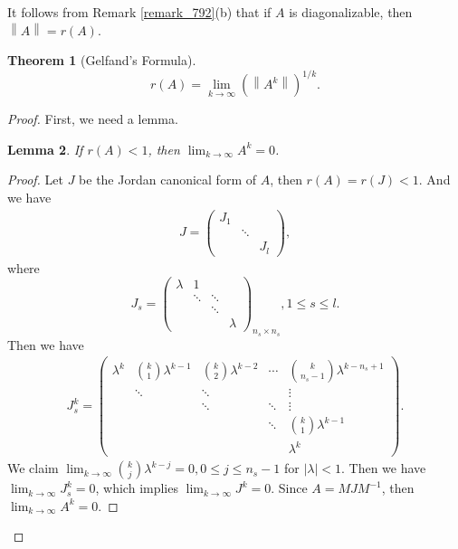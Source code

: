 \documentclass[11pt]{book}
\newtheorem{theorem}{Theorem}[chapter]
\newtheorem{lemma}[theorem]{Lemma}
\theoremstyle{definition}
\numberwithin{equation}{chapter}
\begin{document}
\medskip

It follows from Remark \ref{remark_792}(b) that if $A$ is diagonalizable, then $\left\|A\right\| = r(A)$.

\medskip

\begin{theorem}[Gelfand's Formula]\label{Gelfand_Formula}
$$r(A) = \lim_{k\to\infty} \left(\left\|A^k\right\|\right)^{1/k}. $$
\end{theorem}
\begin{proof}
First, we need a lemma.
\begin{lemma}\label{Gelfand_Formula_lemma}
If $r(A) < 1$, then $\lim_{k\to\infty}A^k = 0$.
\end{lemma}
\begin{proof}
Let $J$ be the Jordan canonical form of $A$, then $r(A) = r(J) < 1$. And we have 
\begin{align*}
    J =  \begin{pmatrix}
    J_1 &  &  \\
     & \ddots  &  \\
     &   & J_l
    \end{pmatrix},
\end{align*}
where $$J_s = \left(\begin{smallmatrix}
    \lambda & 1 &  & \\
     & \ddots  & \ddots & \\
     &   & \ddots &  \\
     &   &   & \lambda
\end{smallmatrix}\right)_{n_s\times n_s}, 1\leq s\leq l.$$
Then we have 
\begin{align*}
    J_s^k = \begin{pmatrix}
    \lambda^k & \binom{k}{1}\lambda^{k-1} & \binom{k}{2}\lambda^{k-2} & \cdots & \binom{k}{n_s-1} \lambda^{k - n_s +1} \\
     & \ddots  & \ddots &  & \vdots \\
     &         & \ddots &  \ddots & \vdots \\
     &         &        &  \ddots & \binom{k}{1}\lambda^{k-1} \\
     &         &        &         & \lambda^k
    \end{pmatrix}.
\end{align*}
We claim $\lim_{k\to\infty}\binom{k}{j}\lambda^{k-j} = 0, 0\leq j\leq n_s-1$ for $|\lambda| < 1$. Then we have $\lim_{k\to\infty} J_s^k = 0$, which implies $\lim_{k\to\infty} J^k = 0$. Since $A = MJM^{-1}$, then $\lim_{k\to\infty} A^k = 0$.
\end{proof}


\end{proof}
\end{document}
